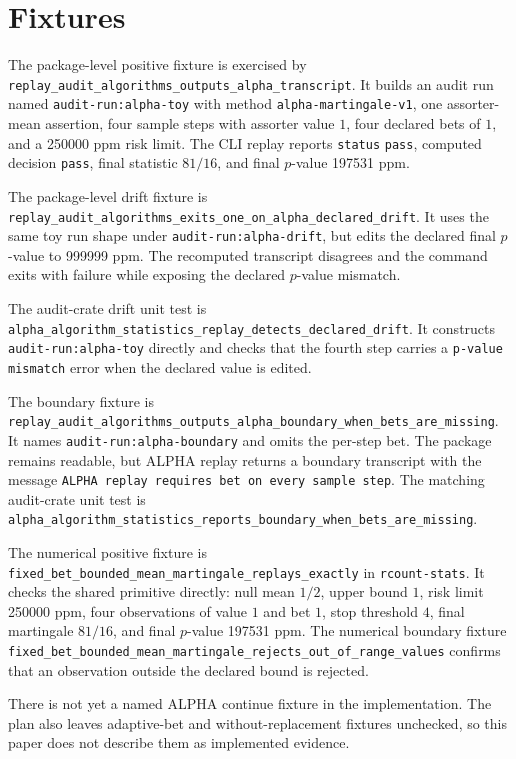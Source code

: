 \section{Fixtures}

The package-level positive fixture is exercised by
\texttt{replay\_audit\_algorithms\_outputs\_alpha\_transcript}. It builds an
audit run named \texttt{audit-run:alpha-toy} with method
\texttt{alpha-martingale-v1}, one assorter-mean assertion, four sample steps
with assorter value $1$, four declared bets of $1$, and a 250000 ppm risk
limit. The CLI replay reports \texttt{status} \texttt{pass}, computed decision
\texttt{pass}, final statistic $81/16$, and final $p$-value 197531 ppm.

The package-level drift fixture is
\texttt{replay\_audit\_algorithms\_exits\_one\_on\_alpha\_declared\_drift}.
It uses the same toy run shape under \texttt{audit-run:alpha-drift}, but edits
the declared final $p$-value to 999999 ppm. The recomputed transcript disagrees
and the command exits with failure while exposing the declared $p$-value
mismatch.

The audit-crate drift unit test is
\texttt{alpha\_algorithm\_statistics\_replay\_detects\_declared\_drift}. It
constructs \texttt{audit-run:alpha-toy} directly and checks that the fourth
step carries a \texttt{p-value mismatch} error when the declared value is
edited.

The boundary fixture is
\texttt{replay\_audit\_algorithms\_outputs\_alpha\_boundary\_when\_bets\_are\_missing}.
It names \texttt{audit-run:alpha-boundary} and omits the per-step bet. The
package remains readable, but ALPHA replay returns a boundary transcript with
the message \texttt{ALPHA replay requires bet on every sample step}. The
matching audit-crate unit test is
\texttt{alpha\_algorithm\_statistics\_reports\_boundary\_when\_bets\_are\_missing}.

The numerical positive fixture is
\texttt{fixed\_bet\_bounded\_mean\_martingale\_replays\_exactly} in
\texttt{rcount-stats}. It checks the shared primitive directly: null mean
$1/2$, upper bound $1$, risk limit 250000 ppm, four observations of value $1$
and bet $1$, stop threshold $4$, final martingale $81/16$, and final $p$-value
197531 ppm. The numerical boundary fixture
\texttt{fixed\_bet\_bounded\_mean\_martingale\_rejects\_out\_of\_range\_values}
confirms that an observation outside the declared bound is rejected.

There is not yet a named ALPHA continue fixture in the implementation. The plan
also leaves adaptive-bet and without-replacement fixtures unchecked, so this
paper does not describe them as implemented evidence.
